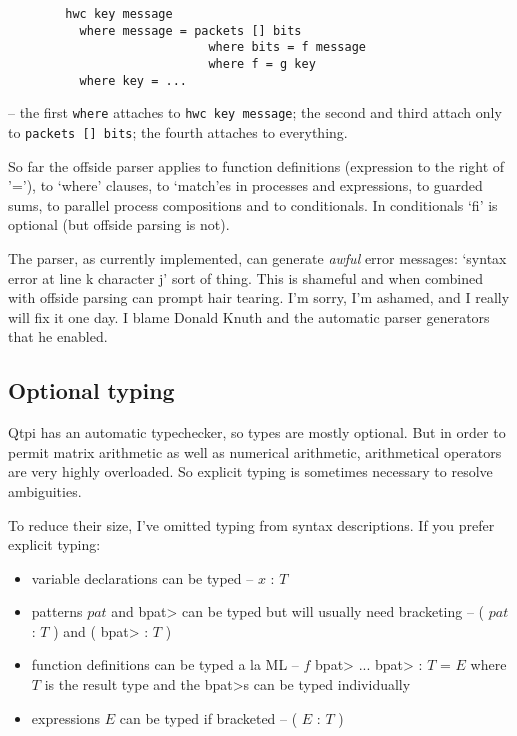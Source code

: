 \documentclass[11pt,a4paper]{article}
\newcommand{\verbtt}[1]{\texttt{\small{}#1}}
\begin{document}
\begin{verbatim}
		hwc key message
		  where message = packets [] bits
		                    where bits = f message
		                    where f = g key
		  where key = ...
\end{verbatim}
	
-- the first \verbtt{where} attaches to \verbtt{hwc key message}; the second and third attach only to \verbtt{packets [] bits}; the fourth attaches to everything.

So far the offside parser applies to function definitions (expression to the right of '='), to `where' clauses, to `match'es in processes and expressions, to guarded sums, to parallel process compositions and to conditionals. In conditionals `fi' is optional (but offside parsing is not).

The parser, as currently implemented, can generate \emph{awful} error messages: `syntax error at line k character j' sort of thing. This is shameful and when combined with offside parsing can prompt hair tearing. I'm sorry, I'm ashamed, and I really will fix it one day. I blame Donald Knuth and the automatic parser generators that he enabled.

\subsection{Optional typing}

Qtpi has an automatic typechecker, so types are mostly optional. But in order to permit matrix arithmetic as well as numerical arithmetic, arithmetical operators are very highly overloaded. So explicit typing is sometimes necessary to resolve ambiguities.

To reduce their size, I've omitted typing from syntax descriptions. If you prefer explicit typing:  

\begin{itemize}
\item variable declarations can be typed -- $x$ : $T$
\item patterns $pat$ and \<bpat> can be typed but will usually need bracketing -- ( $pat$ : $T$ ) and ( \<bpat> : $T$ ) 
\item function definitions can be typed a la ML -- $f$ \<bpat> ... \<bpat> : $T$ = $E$  where $T$ is the result type and the \<bpat>s can be typed individually
\item expressions $E$ can be typed if bracketed -- ( $E$ : $T$ )
\end{itemize}
\end{document}
